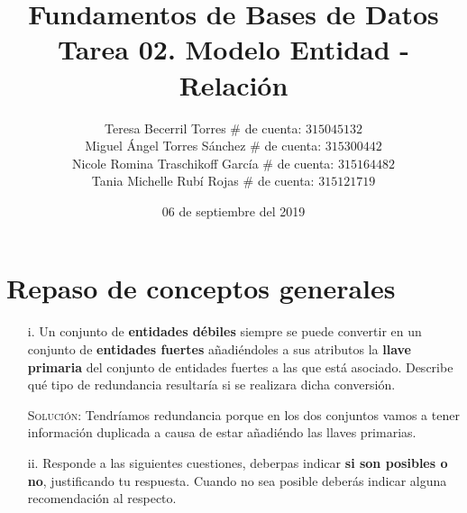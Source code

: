 \documentclass[letterpaper,11pt]{article}
\title{Fundamentos de Bases de Datos \\
       Tarea 02. Modelo Entidad - Relación}
\author{Teresa Becerril Torres
        $\#$ de cuenta: $315045132$ \\
        Miguel Ángel Torres Sánchez
        $\#$ de cuenta: $315300442$ \\
        Nicole Romina Traschikoff García
        $\#$ de cuenta: $315164482$ \\
        Tania Michelle Rubí Rojas
        $\#$ de cuenta: $315121719$}
\date{06 de septiembre del 2019}
\begin{document}
\maketitle

\section{Repaso de conceptos generales}
\begin{itemize}
    \item[i.] Un conjunto de \textbf{entidades débiles} siempre se puede 
    convertir en un conjunto de \textbf{entidades fuertes} añadiéndoles a sus 
    atributos la \textbf{llave primaria} del conjunto de entidades fuertes a 
    las que está asociado. Describe qué tipo de redundancia resultaría si se 
    realizara dicha conversión.

    \textsc{Solución:} Tendríamos redundancia porque en los dos conjuntos vamos 
    a tener información duplicada a causa de estar añadiéndo las llaves 
    primarias.

    \item[ii.] Responde a las siguientes cuestiones, deberpas indicar 
    \textbf{si son posibles o no}, justificando tu respuesta. Cuando no sea 
    posible deberás indicar alguna recomendación al respecto.


\end{itemize}
\end{document}
